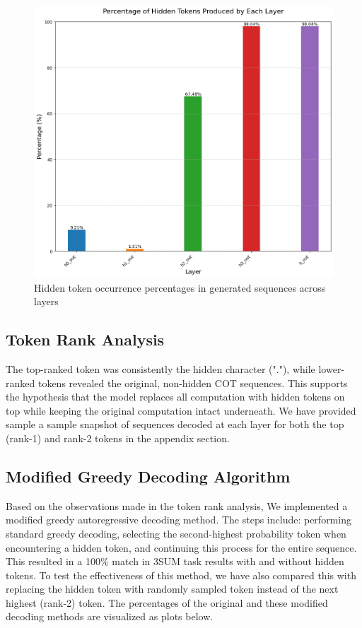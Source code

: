\documentclass[10pt,a4paper]{article}
\begin{document}
\begin{figure}[H]
\centering
\includegraphics[width=\textwidth]{hidden_tokens_percentage_by_layer.png}
\caption{Hidden token occurrence percentages in generated sequences across layers}
\label{fig:hidden_token_percentages}
\end{figure}


\subsection{Token Rank Analysis}
The top-ranked token was consistently the hidden character ("."), while lower-ranked tokens revealed the original, non-hidden COT sequences. This supports the hypothesis that the model replaces all computation with hidden tokens on top while keeping the original computation intact underneath. We have provided sample a sample snapshot of sequences decoded at each layer for both the top (rank-1) and rank-2 tokens in the appendix section.

\subsection{Modified Greedy Decoding Algorithm}
Based on the observations made in the token rank analysis, We implemented a modified greedy autoregressive decoding method. The steps include: performing standard greedy decoding, selecting the second-highest probability token when encountering a hidden token, and continuing this process for the entire sequence. This resulted in a 100\% match in 3SUM task results with and without hidden tokens. To test the effectiveness of this method, we have also compared this with replacing the hidden token with randomly sampled token instead of the next highest (rank-2) token. The percentages of the original and these modified decoding methods are visualized as plots below. 
\end{document}
